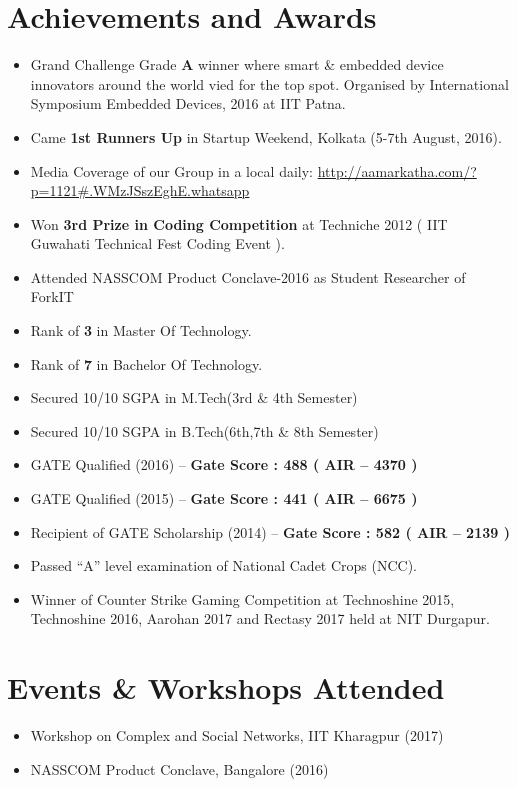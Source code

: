 \documentclass[margin, centered]{res}
\begin{document}
\begin{resume}
\section{Achievements and Awards}
\begin{itemize}[leftmargin=*]
 \item Grand Challenge Grade \textbf{A} winner where smart \& embedded device innovators around the world vied for the top spot. Organised by International Symposium Embedded Devices, 2016 at IIT Patna.
 \item Came \textbf{1st Runners Up} in Startup Weekend, Kolkata (5-7th August, 2016).
 \item Media Coverage of our Group in a local daily: \url{http://aamarkatha.com/?p=1121#.WMzJSszEghE.whatsapp}
 \item Won \textbf{3rd Prize in Coding Competition} at Techniche 2012 ( IIT Guwahati Technical Fest Coding Event ).
 \item Attended NASSCOM Product Conclave-2016 as Student Researcher of ForkIT
 \item Rank of \textbf{3} in Master Of Technology.
 \item Rank of \textbf{7} in Bachelor Of Technology.
 \item Secured 10/10 SGPA in M.Tech(3rd \& 4th Semester)
 \item Secured 10/10 SGPA in B.Tech(6th,7th \& 8th Semester)
 \newpage
 \item GATE Qualified (2016) – \textbf{Gate Score : 488 ( AIR – 4370 ) }
 \item GATE Qualified (2015) – \textbf{Gate Score : 441 ( AIR – 6675 ) }
 \item Recipient of GATE Scholarship (2014) – \textbf{Gate Score : 582 ( AIR – 2139 ) }

 \item Passed “A” level examination of National Cadet Crops (NCC).
 \item Winner of Counter Strike Gaming Competition at Technoshine 2015, Technoshine 2016, Aarohan 2017 and Rectasy 2017 held at NIT Durgapur.
\end{itemize}


\section{Events \& Workshops Attended}
\begin{itemize}[leftmargin=*]
\item Workshop on Complex and Social Networks, IIT Kharagpur (2017)
\item NASSCOM Product Conclave, Bangalore (2016)
\end{itemize}


\end{resume}
\end{document}
